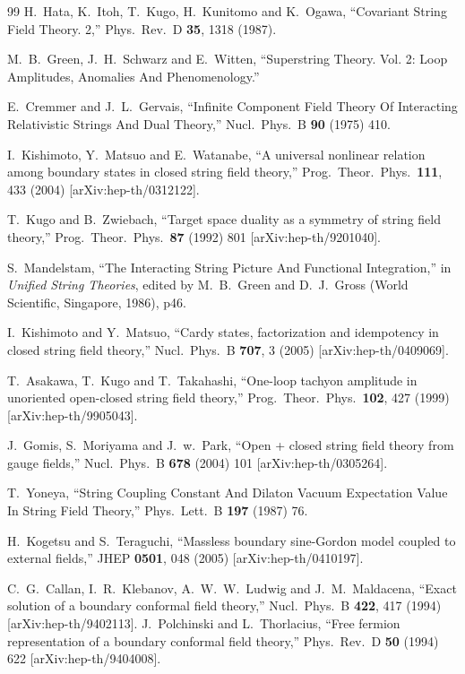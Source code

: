\documentclass[12pt]{article}
\begin{document}
\begin{thebibliography}{99}
H.~Hata, K.~Itoh, T.~Kugo, H.~Kunitomo and K.~Ogawa,
``Covariant String Field Theory. 2,''
Phys.\ Rev.\ D {\bf 35}, 1318 (1987).

M.~B.~Green, J.~H.~Schwarz and E.~Witten,
``Superstring Theory. Vol. 2: Loop Amplitudes, Anomalies And
Phenomenology.''

E.~Cremmer and J.~L.~Gervais,
``Infinite Component Field Theory Of Interacting Relativistic Strings
And Dual Theory,''
Nucl.\ Phys.\ B {\bf 90} (1975) 410.

I.~Kishimoto, Y.~Matsuo and E.~Watanabe,
``A universal nonlinear relation among boundary states in closed string
field theory,''
Prog.\ Theor.\ Phys.\  {\bf 111}, 433 (2004)
[arXiv:hep-th/0312122].

T.~Kugo and B.~Zwiebach,
``Target space duality as a symmetry of string field theory,''
Prog.\ Theor.\ Phys.\  {\bf 87} (1992) 801
[arXiv:hep-th/9201040].

S.~Mandelstam,
``The Interacting String Picture And Functional Integration,''
in {\it Unified String Theories}, edited by M.~B.~Green and
D.~J.~Gross (World Scientific, Singapore, 1986), p46.

I.~Kishimoto and Y.~Matsuo,
``Cardy states, factorization and idempotency in closed string field
theory,''
Nucl.\ Phys.\ B {\bf 707}, 3 (2005)
[arXiv:hep-th/0409069].

T.~Asakawa, T.~Kugo and T.~Takahashi,
``One-loop tachyon amplitude in unoriented open-closed string field
theory,''
Prog.\ Theor.\ Phys.\  {\bf 102}, 427 (1999)
[arXiv:hep-th/9905043].

J.~Gomis, S.~Moriyama and J.~w.~Park,
``Open + closed string field theory from gauge fields,''
Nucl.\ Phys.\ B {\bf 678} (2004) 101
[arXiv:hep-th/0305264].

T.~Yoneya,
``String Coupling Constant And Dilaton Vacuum Expectation Value In String
Field Theory,''
Phys.\ Lett.\ B {\bf 197} (1987) 76.

H.~Kogetsu and S.~Teraguchi,
``Massless boundary sine-Gordon model coupled to external fields,''
JHEP {\bf 0501}, 048 (2005)
[arXiv:hep-th/0410197].

C.~G.~Callan, I.~R.~Klebanov, A.~W.~W.~Ludwig and J.~M.~Maldacena,
``Exact solution of a boundary conformal field theory,''
Nucl.\ Phys.\ B {\bf 422}, 417 (1994)
[arXiv:hep-th/9402113].
J.~Polchinski and L.~Thorlacius,
``Free fermion representation of a boundary conformal field theory,''
Phys.\ Rev.\ D {\bf 50} (1994) 622
[arXiv:hep-th/9404008].

\end{thebibliography}
\end{document}
